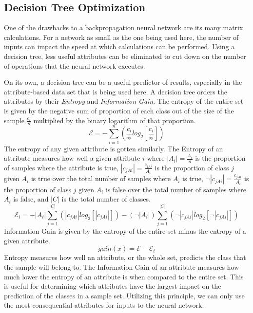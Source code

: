 \documentclass[12pt]{article}
\begin{document}
    \subsection{Decision Tree Optimization}
        One of the drawbacks to a backpropagation neural network are its many matrix calculations.  For a network as small as the
        one being used here, the number of inputs can impact the speed at which calculations can be performed.  Using a decision tree,
        less useful attributes can be eliminated to cut down on the number of operations that the neural network executes.

        On its own, a decision tree can be a useful predictor of results, especially in the attribute-based data set that is being used here.
        A decision tree orders the attributes by their \textit{Entropy} and \textit{Information Gain}.  The entropy of the entire set is given by the negative 
        sum of proportion of each class out of the size of the sample \(\frac{c_i}{n}\) multiplied by the binary logarithm of that proportion. 
        \begin{equation}\label{totalEntropy}
            \mathcal{E} = -\sum_{i=1}^{n} (\frac{c_i}{n} log_2[\frac{c_i}{n}])
        \end{equation}
        The entropy of any given attribute is gotten similarly.
        The Entropy of an attribute measures how well a given attribute \(i\) where \(|A_i| = \frac{A_i}{n}\) is the proportion of samples where the attribute is true,
        \(|c_{jAi}| = \frac{c_{jAi}}{A_i}\) is the proportion of class \(j\) given \(A_i\) is true over the total number of samples where \(A_i\) is true,
        \(\neg|c_{jAi}| = \frac{c_{jAi}}{~A_i}\) is the proportion of class \(j\) given \(A_i\) is false over the total number of samples where \(A_i\) is false, 
        and \(|C|\) is the total number of classes.
        \begin{equation}\label{attribInfoGain}
            \mathcal{E}_i = -|A_i| \sum_{j=1}^{|C|} (|c_{jAi}| log_2[|c_{jAi}|]) - (\neg|A_i|) \sum_{j=1}^{|C|} (\neg|c_{jAi}| log_2[\neg|c_{jAi}|])
        \end{equation} 
        Information Gain is given by the entropy of the entire set minus the entropy of a given attribute.
        \begin{equation}\label{infoGain}
            gain(x) = \mathcal{E} - \mathcal{E}_i
        \end{equation} 
        Entropy measures how well an attribute, or the whole set, predicts the class that the sample will belong to. 
        The Information Gain of an attribute measures how much lower the entropy of
        an attribute is when compared to the entire set.  This is useful for determining which attributes have the largest impact on the
        prediction of the classes in a sample set.  Utilizing this principle, we can only use the most consequential attributes for inputs to the
        neural network.
\end{document}
